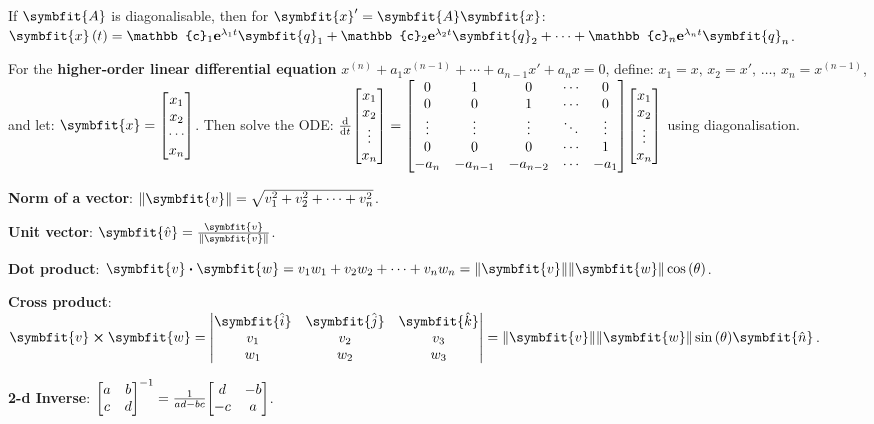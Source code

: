 \documentclass{article}
\begin{document}
\noindent If $\symbfit{A}$ is diagonalisable, then for $\symbfit{x}' = \symbfit{A} \symbfit{x}$: $\func{\symbfit{x}}{t} = \mathbb{c}_1 \e^{\lambda_1 t} \symbfit{q}_1 + \mathbb{c}_2 \e^{\lambda_2 t} \symbfit{q}_2 + \cdots + \mathbb{c}_n \e^{\lambda_n t} \symbfit{q}_n$.
	
\noindent For the \textbf{higher-order linear differential equation} $x^{\left( n \right)} + a_1 x^{\left( n-1 \right)} + \cdots + a_{n-1} x' + a_n x = 0$, define: $x_1 = x,\, x_2 = x',\, \dots,\, x_n = x^{\left( n-1 \right)}$, and let: $\symbfit{x}=\mqty[x_1 \\ x_2 \\ \cdots \\ x_n]$. Then solve the ODE: 
$\dv{t}\mqty[
	x_1 \\
	x_2 \\
	\vdotswithin{x_3} \\
	x_n	
] = \mqty[
	0 & 1 & 0 & \cdots & 0 \\
	0 & 0 & 1 & \cdots & 0 \\
	\vdots & \vdots & \vdots & \ddots & \vdots \\
	0 & 0 & 0 & \cdots & 1 \\
	-a_n & -a_{n-1} & -a_{n-2} & \cdots & -a_1
] \mqty[
	x_1 \\
	x_2 \\
	\vdotswithin{x_3} \\
	x_n	
]$ using diagonalisation.
\thispagestyle{empty}
\pagebreak

\noindent\textbf{Norm of a vector}: $\norm{\symbfit{v}} = \sqrt{v_1^2 + v_2^2+\dots+v_n^2}$.

\noindent\textbf{Unit vector}: $\symbfit{\hat{v}} = \frac{\symbfit{v}}{\norm{\symbfit{v}}}$.

\noindent\textbf{Dot product}: $\symbfit{v}\vdot\symbfit{w}= v_1 w_1 + v_2 w_2 + \cdots + v_n w_n = \norm{\symbfit{v}} \norm{\symbfit{w}} \cos{\left(\theta\right)}$.

\noindent\textbf{Cross product}: $
\symbfit{v}\cross\symbfit{w} = 
\mqty|
	\symbfit{\hat{i}} & \symbfit{\hat{j}} & \symbfit{\hat{k}} \\
	v_1 & v_2 & v_3 \\
	w_1 & w_2 & w_3
| =
\norm{\symbfit{v}}\norm{\symbfit{w}}\sin{\left(\theta\right)}\symbfit{\hat{n}}
$.

\noindent\textbf{2-d Inverse}: $\mqty[a & b \\ c & d]^{-1} = \frac{1}{ad - bc} \mqty[d & -b \\ -c & a]$.
\end{document}
